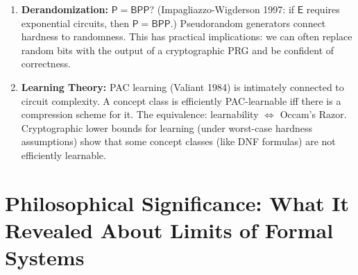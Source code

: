 \begin{enumerate}
\item \textbf{Derandomization:} $\mathsf{P} = \mathsf{BPP}$? (Impagliazzo-Wigderson 1997: if $\mathsf{E}$ requires exponential circuits, then $\mathsf{P} = \mathsf{BPP}$.) Pseudorandom generators connect hardness to randomness. This has practical implications: we can often replace random bits with the output of a cryptographic PRG and be confident of correctness.

\item \textbf{Learning Theory:} PAC learning (Valiant 1984) is intimately connected to circuit complexity. A concept class is efficiently PAC-learnable iff there is a compression scheme for it. The equivalence: learnability $\iff$ Occam's Razor. Cryptographic lower bounds for learning (under worst-case hardness assumptions) show that some concept classes (like DNF formulas) are not efficiently learnable.

\end{enumerate}

\section{Philosophical Significance: What It Revealed About Limits of Formal Systems}
\label{sec:complexity:philosophy}

